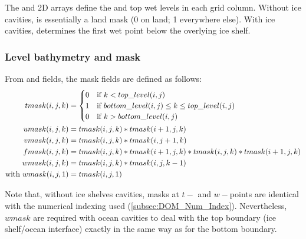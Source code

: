 \documentclass[../main/NEMO_manual]{subfiles}
\begin{document}
The  and  2D arrays define
the  and top wet levels in each grid column.
Without ice cavities,  is essentially a land mask (0 on land; 1 everywhere else).
With ice cavities,  determines the first wet point below the overlying ice shelf.

\subsubsection{Level bathymetry and mask}
\label{subsec:DOM_msk}

From  and  fields, the mask fields are defined as follows:
\begin{align*}
  tmask(i,j,k) &=
  \begin{cases}
    0 &\text{if $                             k <    top\_level(i,j)$} \\
    1 &\text{if $     bottom\_level(i,j) \leq k \leq top\_level(i,j)$} \\
    0 &\text{if $k >  bottom\_level(i,j)                            $}
  \end{cases} \\
  umask(i,j,k) &= tmask(i,j,k) * tmask(i + 1,j,    k) \\
  vmask(i,j,k) &= tmask(i,j,k) * tmask(i    ,j + 1,k) \\
  fmask(i,j,k) &= tmask(i,j,k) * tmask(i + 1,j,    k) * tmask(i,j,k) * tmask(i + 1,j,    k) \\
  wmask(i,j,k) &= tmask(i,j,k) * tmask(i    ,j,k - 1) \\
  \text{with~} wmask(i,j,1) &= tmask(i,j,1)
\end{align*}

Note that, without ice shelves cavities,
masks at $t-$ and $w-$points are identical with the numerical indexing used
(\autoref{subsec:DOM_Num_Index}).
Nevertheless,
$wmask$ are required with ocean cavities to deal with the top boundary (ice shelf/ocean interface)
exactly in the same way as for the bottom boundary.

\end{document}
